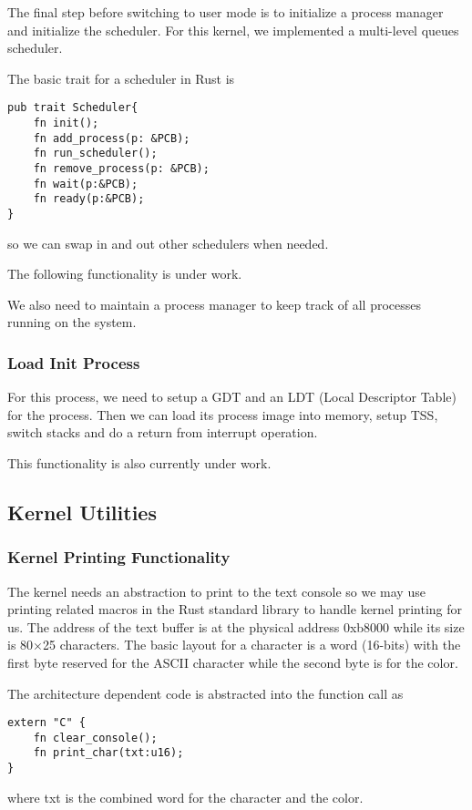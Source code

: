 \documentclass[conference]{IEEEtran}
\begin{document}
The final step before switching to user mode is to initialize a process manager and initialize the scheduler. For this kernel, we implemented a multi-level queues scheduler.

The basic trait for a scheduler in Rust is
\begin{verbatim}
pub trait Scheduler{
    fn init();
    fn add_process(p: &PCB);
    fn run_scheduler();
    fn remove_process(p: &PCB);
    fn wait(p:&PCB);
    fn ready(p:&PCB); 
}
\end{verbatim}
so we can swap in and out other schedulers when needed.

The following functionality is under work.

We also need to maintain a process manager to keep track of all processes running on the system.

\subsubsection{Load Init Process}

For this process, we need to setup a GDT and an LDT (Local Descriptor Table) for the process. Then we can load its process image into memory, setup TSS, switch stacks and do a return from interrupt operation.

This functionality is also currently under work.

\subsection{Kernel Utilities}

\subsubsection{Kernel Printing Functionality}

The kernel needs an abstraction to print to the text console so we may use printing related macros in the Rust standard library to handle kernel printing for us. The address of the text buffer is at the physical address 0xb8000 while its size is 80$\times$25 characters. The basic layout for a character is a word (16-bits) with the first byte reserved for the ASCII character while the second byte is for the color.

The architecture dependent code is abstracted into the function call as 
\begin{verbatim}
extern "C" {
    fn clear_console();
    fn print_char(txt:u16);
}
\end{verbatim}
where txt is the combined word for the character and the color.
\end{document}
